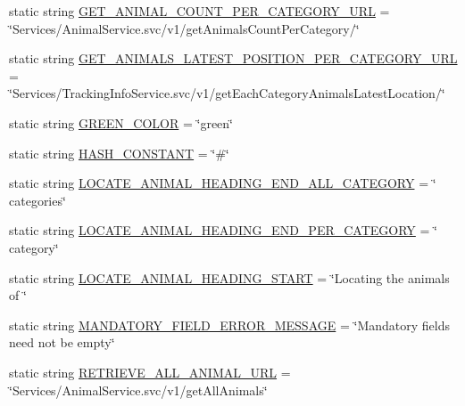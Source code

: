 \begin{DoxyCompactItemize}
\item 
static string \hyperlink{classWildlifeTrackingApp_1_1Utility_1_1Constants_a57e74b3240cd0851eabf612486d7f9e3}{G\+E\+T\+\_\+\+A\+N\+I\+M\+A\+L\+\_\+\+C\+O\+U\+N\+T\+\_\+\+P\+E\+R\+\_\+\+C\+A\+T\+E\+G\+O\+R\+Y\+\_\+\+U\+RL} = \char`\"{}Services/Animal\+Service.\+svc/v1/get\+Animals\+Count\+Per\+Category/\char`\"{}
\item 
static string \hyperlink{classWildlifeTrackingApp_1_1Utility_1_1Constants_a4f1233471c34da67abf4bf0404a4f496}{G\+E\+T\+\_\+\+A\+N\+I\+M\+A\+L\+S\+\_\+\+L\+A\+T\+E\+S\+T\+\_\+\+P\+O\+S\+I\+T\+I\+O\+N\+\_\+\+P\+E\+R\+\_\+\+C\+A\+T\+E\+G\+O\+R\+Y\+\_\+\+U\+RL} = \char`\"{}Services/Tracking\+Info\+Service.\+svc/v1/get\+Each\+Category\+Animals\+Latest\+Location/\char`\"{}
\item 
static string \hyperlink{classWildlifeTrackingApp_1_1Utility_1_1Constants_a784acb2579317d1e18bd4d1ab4c81461}{G\+R\+E\+E\+N\+\_\+\+C\+O\+L\+OR} = \char`\"{}green\char`\"{}
\item 
static string \hyperlink{classWildlifeTrackingApp_1_1Utility_1_1Constants_a68104863796be82394071d37ec376133}{H\+A\+S\+H\+\_\+\+C\+O\+N\+S\+T\+A\+NT} = \char`\"{}\#\char`\"{}
\item 
static string \hyperlink{classWildlifeTrackingApp_1_1Utility_1_1Constants_afdc7b6bb94c9377a9e60acda8105859b}{L\+O\+C\+A\+T\+E\+\_\+\+A\+N\+I\+M\+A\+L\+\_\+\+H\+E\+A\+D\+I\+N\+G\+\_\+\+E\+N\+D\+\_\+\+A\+L\+L\+\_\+\+C\+A\+T\+E\+G\+O\+RY} = \char`\"{} categories\char`\"{}
\item 
static string \hyperlink{classWildlifeTrackingApp_1_1Utility_1_1Constants_a3f930b0b0329e9a6d8f433cbdff3a36d}{L\+O\+C\+A\+T\+E\+\_\+\+A\+N\+I\+M\+A\+L\+\_\+\+H\+E\+A\+D\+I\+N\+G\+\_\+\+E\+N\+D\+\_\+\+P\+E\+R\+\_\+\+C\+A\+T\+E\+G\+O\+RY} = \char`\"{} category\char`\"{}
\item 
static string \hyperlink{classWildlifeTrackingApp_1_1Utility_1_1Constants_a1935c9ba5401447e9f2c09ea6f36f3f5}{L\+O\+C\+A\+T\+E\+\_\+\+A\+N\+I\+M\+A\+L\+\_\+\+H\+E\+A\+D\+I\+N\+G\+\_\+\+S\+T\+A\+RT} = \char`\"{}Locating the animals of \char`\"{}
\item 
static string \hyperlink{classWildlifeTrackingApp_1_1Utility_1_1Constants_ab77321730fc5eb654915efb17d410aa7}{M\+A\+N\+D\+A\+T\+O\+R\+Y\+\_\+\+F\+I\+E\+L\+D\+\_\+\+E\+R\+R\+O\+R\+\_\+\+M\+E\+S\+S\+A\+GE} = \char`\"{}Mandatory fields need not be empty\char`\"{}
\item 
static string \hyperlink{classWildlifeTrackingApp_1_1Utility_1_1Constants_a2d7a4d0bda458906e6bca3a1ab24248c}{R\+E\+T\+R\+I\+E\+V\+E\+\_\+\+A\+L\+L\+\_\+\+A\+N\+I\+M\+A\+L\+\_\+\+U\+RL} = \char`\"{}Services/Animal\+Service.\+svc/v1/get\+All\+Animals\char`\"{}

\end{DoxyCompactItemize}
